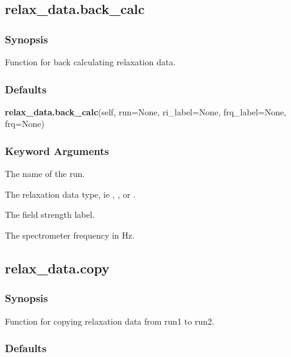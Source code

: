 



\newpage

\subsection{relax\_data.back\_calc}


\subsubsection{Synopsis}

Function for back calculating relaxation data.

\subsubsection{Defaults}

\textsf{\textbf{relax\_data.back\_calc}(self, run=None, ri\_label=None, frq\_label=None, frq=None)}


\subsubsection{Keyword Arguments}


  The name of the run.

  The relaxation  data type, ie 
, 
, or 
.

  The field strength label.

  The spectrometer frequency in Hz.


\newpage

\subsection{relax\_data.copy}


\subsubsection{Synopsis}

Function for copying relaxation data from run1 to run2.

\subsubsection{Defaults}

